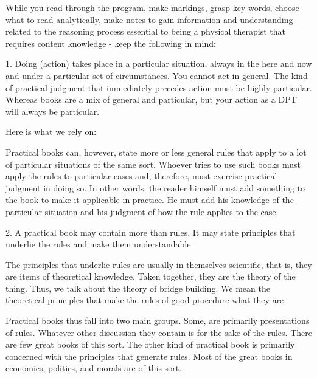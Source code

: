 While you read through the program, make markings, grasp key words, choose what to read analytically, make notes to gain information and understanding related to the reasoning process essential to being a physical therapist that requires content knowledge - keep the following in mind: 

1. Doing (action) takes place in a particular situation, always in the here and now and under a particular set of circumstances. You cannot act in general. The kind of practical judgment that immediately precedes action must be highly particular. Whereas books are a mix of general and particular, but your action as a DPT will always be particular. 

Here is what we rely on:

\begin{displayquote}
Practical books can, however, state more or less general rules that apply to a lot of particular situations of the same sort. Whoever tries to use such books must apply the rules to particular cases and, therefore, must exercise practical judgment in doing so. In other words, the reader himself must add something to the book to make it applicable in practice. He must add his knowledge of the particular situation and his judgment of how the rule applies to the case.
\end{displayquote}

2. A practical book may contain more than rules. It may state principles that underlie the rules and make them understandable. 

\begin{displayquote}
The principles that underlie rules are usually in themselves scientific, that is, they are items of theoretical knowledge. Taken together, they are the theory of the thing. Thus, we talk about the theory of bridge building. We mean the theoretical principles that make the rules of good procedure what they are.

Practical books thus fall into two main groups. Some, are primarily presentations of rules. Whatever other discussion they contain is for the sake of the rules. There are few great books of this sort. The other kind of practical book is primarily concerned with the principles that generate rules. Most of the great books in economics, politics, and morals are of this sort.
\end{displayquote}

